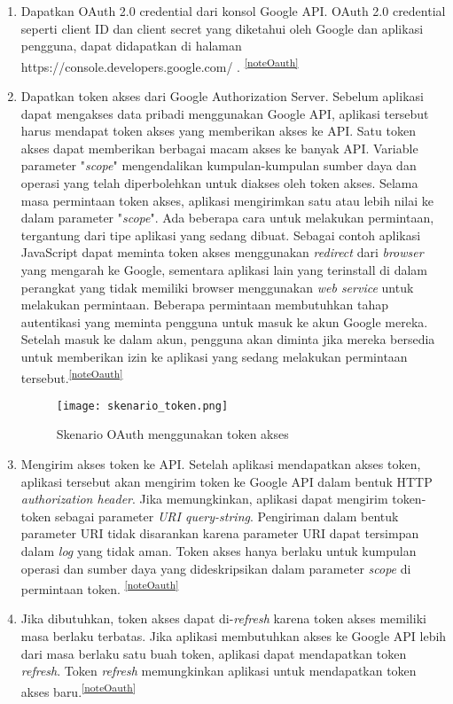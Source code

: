 	\begin{enumerate}
  	\item Dapatkan OAuth 2.0 credential dari konsol Google API. OAuth 2.0 credential seperti client ID dan client secret yang diketahui oleh Google dan aplikasi pengguna, dapat didapatkan di halaman https://console.developers.google.com/ .  \textsuperscript{\ref{noteOauth}}
  	\item Dapatkan token akses dari Google Authorization Server. Sebelum aplikasi dapat mengakses data pribadi menggunakan Google API, aplikasi tersebut harus mendapat token akses yang memberikan akses ke API. Satu token akses dapat memberikan berbagai macam akses ke banyak API. Variable parameter "\textit{scope}" mengendalikan kumpulan-kumpulan sumber daya dan operasi yang telah diperbolehkan untuk diakses oleh token akses. Selama masa permintaan token akses, aplikasi mengirimkan satu atau lebih nilai ke dalam parameter "\textit{scope}". Ada beberapa cara untuk melakukan permintaan, tergantung dari tipe aplikasi yang sedang dibuat. Sebagai contoh aplikasi JavaScript dapat meminta token akses menggunakan \textit{redirect} dari \textit{browser} yang mengarah ke Google, sementara aplikasi lain yang terinstall di dalam perangkat yang tidak memiliki browser menggunakan \textit{web service} untuk melakukan permintaan. Beberapa permintaan membutuhkan tahap autentikasi yang meminta pengguna untuk masuk ke akun Google mereka. Setelah masuk ke dalam akun, pengguna akan diminta jika mereka bersedia untuk memberikan izin ke aplikasi yang sedang melakukan permintaan tersebut.\textsuperscript{\ref{noteOauth}}
  	\begin{figure} [H]
	\centering  
	\texttt{[image: skenario\_token.png]}  
	\caption[Skenario OAuth menggunakan token akses]{Skenario OAuth menggunakan token akses} 
	\label{fig:skenario-token} 
\end{figure}
  	\item Mengirim akses token ke API. Setelah aplikasi mendapatkan akses token, aplikasi tersebut akan mengirim token ke Google API dalam bentuk HTTP \textit{authorization header}. Jika memungkinkan, aplikasi dapat mengirim token-token sebagai parameter \textit{URI query-string}. Pengiriman dalam bentuk parameter URI tidak disarankan karena parameter URI dapat tersimpan dalam \textit{log} yang tidak aman. Token akses hanya berlaku untuk kumpulan operasi dan sumber daya yang dideskripsikan dalam parameter \textit{scope} di permintaan token. \textsuperscript{\ref{noteOauth}}
	\item Jika dibutuhkan, token akses dapat di-\textit{refresh} karena token akses memiliki masa berlaku terbatas. Jika aplikasi membutuhkan akses ke Google API lebih dari masa berlaku satu buah token, aplikasi dapat mendapatkan token \textit{refresh}. Token \textit{refresh} memungkinkan aplikasi untuk mendapatkan token akses baru.\textsuperscript{\ref{noteOauth}}
  
\end{enumerate}

